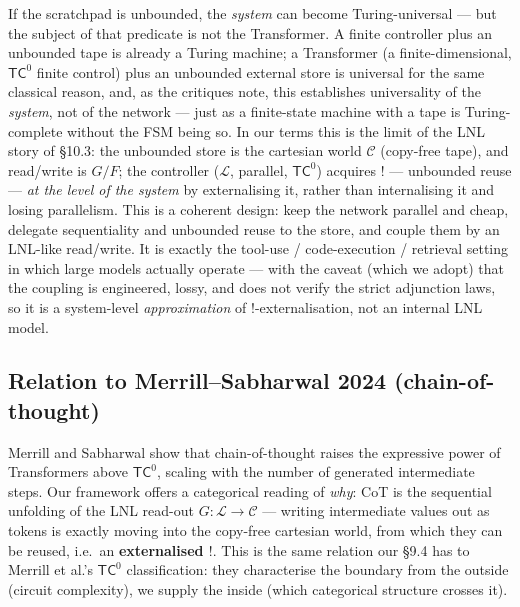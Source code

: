 \documentclass[a4paper,11pt]{article}
\begin{document}
If the scratchpad is unbounded, the \emph{system} can become
Turing-universal --- but the subject of that predicate is not the
Transformer. A finite controller plus an unbounded tape is already a
Turing machine; a Transformer (a finite-dimensional, \(\mathsf{TC}^0\)
finite control) plus an unbounded external store is universal for the
same classical reason, and, as the critiques note, this establishes
universality of the \emph{system}, not of the network --- just as a
finite-state machine with a tape is Turing-complete without the FSM being so. In our terms this is the limit of the LNL story of §10.3: the
unbounded store is the cartesian world \(\mathcal{C}\) (copy-free tape),
and read/write is \(G/F\); the controller (\(\mathcal{L}\), parallel, \(\mathsf{TC}^0\)) acquires \(!\) --- unbounded reuse --- \emph{at the level of the system} by externalising it, rather than internalising it
and losing parallelism. This is a coherent design: keep the network
parallel and cheap, delegate sequentiality and unbounded reuse to the
store, and couple them by an LNL-like read/write. It is exactly the
tool-use / code-execution / retrieval setting in which large models
actually operate --- with the caveat (which we adopt) that the coupling
is engineered, lossy, and does not verify the strict adjunction laws, so
it is a system-level \emph{approximation} of \(!\)-externalisation, not an internal LNL model.

\hypertarget{relation-to-merrillsabharwal-2024-chain-of-thought}{%
\subsection{Relation to Merrill--Sabharwal 2024 (chain-of-thought)}\label{relation-to-merrillsabharwal-2024-chain-of-thought}}

Merrill and Sabharwal \cite{merrill2024expressive} show that chain-of-thought raises the
expressive power of Transformers above \(\mathsf{TC}^0\), scaling with the number of generated intermediate steps. Our framework offers a
categorical reading of \emph{why}: CoT is the sequential unfolding of the LNL read-out \(G:\mathcal{L}\to\mathcal{C}\) --- writing
intermediate values out as tokens is exactly moving into the copy-free
cartesian world, from which they can be reused, i.e.~an \textbf{externalised \(!\)}. This is the same relation our §9.4 has to Merrill et al.'s \(\mathsf{TC}^0\) classification\cite{merrill2023parallelism}: they characterise the boundary from the outside (circuit complexity), we supply the inside (which categorical structure crosses it).
\end{document}
